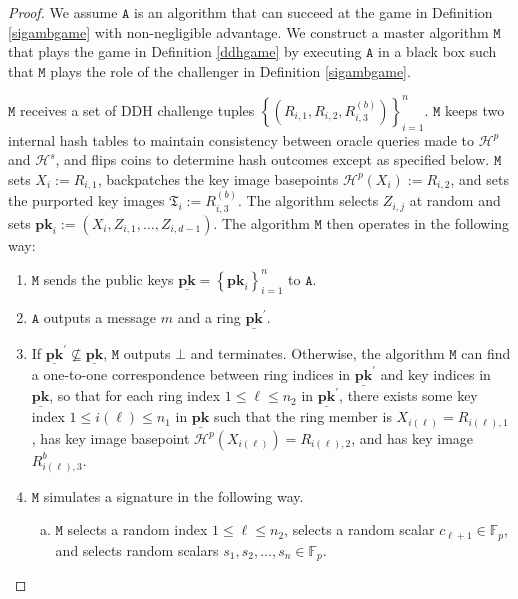 \documentclass{mrl}
\theoremstyle{plain}
\theoremstyle{definition}
\begin{document}
\begin{proof}
We assume $\texttt{A}$ is an algorithm that can succeed at the game in Definition \ref{sigambgame} with non-negligible advantage. We construct a master algorithm $\texttt{M}$ that plays the game in Definition \ref{ddhgame} by executing $\texttt{A}$ in a black box such that $\texttt{M}$ plays the role of the challenger in Definition \ref{sigambgame}. 

$\texttt{M}$ receives a set of DDH challenge tuples $\left\{(R_{i,1}, R_{i,2}, R_{i,3}^{(b)})\right\}_{i=1}^{n}$. $\texttt{M}$ keeps two internal hash tables to maintain consistency between oracle queries made to $\mathcal{H}^p$ and $\mathcal{H}^s$, and flips coins to determine hash outcomes except as specified below. $\texttt{M}$ sets $X_i := R_{i,1}$, backpatches the key image basepoints $\mathcal{H}^p(X_i) := R_{i,2}$, and sets the purported key images $\mathfrak{T}_i := R_{i,3}^{(b)}$. The algorithm selects $Z_{i,j}$ at random and sets $\textbf{pk}_i := (X_i, Z_{i,1}, \ldots, Z_{i,d-1})$. The algorithm $\texttt{M}$ then operates in the following way:
\begin{enumerate}
\item $\texttt{M}$ sends the public keys $\underline{\textbf{pk}} = \left\{\textbf{pk}_i\right\}_{i=1}^{n}$ to $\texttt{A}$. 

\item $\texttt{A}$ outputs a message $m$ and a ring $\underline{\textbf{pk}}^\prime$. 

\item If $\underline{\textbf{pk}}^\prime \not\subseteq \underline{\textbf{pk}}$, $\texttt{M}$ outputs $\bot$ and terminates. Otherwise, the algorithm $\texttt{M}$ can find a one-to-one correspondence between ring indices in $\underline{\textbf{pk}}^\prime$ and key indices in $\underline{\textbf{pk}}$, so that for each ring index $1 \leq \ell \leq n_2$ in $\underline{\textbf{pk}}^\prime$, there exists some key index $1 \leq i(\ell) \leq n_1$ in $\underline{\textbf{pk}}$ such that the ring member is $X_{i(\ell)} = R_{i(\ell),1}$, has key image basepoint $\mathcal{H}^p(X_{i(\ell)}) = R_{i(\ell),2}$, and has key image $R_{i(\ell),3}^b$. 

\item $\texttt{M}$ simulates a signature in the following way.
\begin{enumerate}[(a)]
\item $\texttt{M}$ selects a random index $1 \leq \ell \leq n_2$, selects a random scalar $c_{\ell+1} \in \mathbb{F}_p$, and selects random scalars $s_1, s_2, \ldots, s_n \in \mathbb{F}_p$.


\end{enumerate}
\end{enumerate}
\end{proof}
\end{document}
